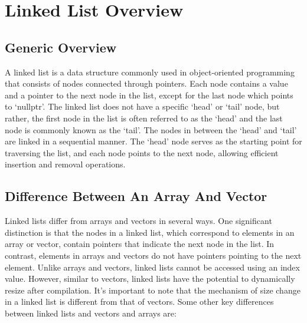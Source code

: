 \documentclass[a4paper,9pt]{article}
\begin{document}
\section*{Linked List Overview}

\subsection*{Generic Overview}

A linked list is a data structure commonly used in object-oriented programming that consists of nodes connected through 
pointers. Each node contains a value and a pointer to the next node in the list, except for the last node which points 
to `nullptr'. The linked list does not have a specific `head' or `tail' node, but rather, the first node in the list is 
often referred to as the `head' and the last node is commonly known as the `tail'. The nodes in between the `head' and 
`tail' are linked in a sequential manner. The `head' node serves as the starting point for traversing the list, and each 
node points to the next node, allowing efficient insertion and removal operations.

\subsection*{Difference Between An Array And Vector}

Linked lists differ from arrays and vectors in several ways. One significant distinction is that the nodes in a linked list, 
which correspond to elements in an array or vector, contain pointers that indicate the next node in the list. In contrast, 
elements in arrays and vectors do not have pointers pointing to the next element. Unlike arrays and vectors, linked lists 
cannot be accessed using an index value. However, similar to vectors, linked lists have the potential to dynamically resize 
after compilation. It's important to note that the mechanism of size change in a linked list is different from that of vectors.
Some other key differences between linked lists and vectors and arrays are:
\end{document}
